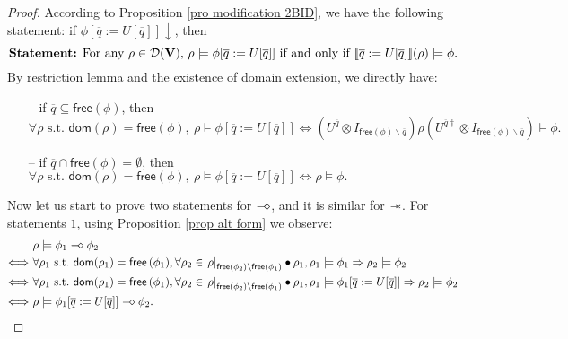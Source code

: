 \documentclass[conference,compsoc, 10pt]{IEEEtran}
\newcommand {\qbar} {{\overline{q}}}
\newcommand {\qU} {{\overline{q}:=U[\overline{q}]}}
\newcommand {\cD } {{\mathcal{D}}}
\newcommand {\id } {{I}}
\newcommand {\dom }[1] {{\mathsf{dom}\!\left(#1\right)}}
\newcommand {\free }[1] {{\mathsf{free}\left(#1\right)}}
\newcommand {\rt }[2] {{\left.{#1}\right|_{#2}}}
\newcommand {\vars } {\mathbf{V}}
\newcommand {\sepimp} {\mathrel{-\mkern-6mu*}}
\newcommand {\sem}[1] {\llbracket#1\rrbracket}
\newcommand {\sdimp} {\mathrel{-\mkern-2.5mu\diamond}}
\begin{document}
\begin{appendices}
		\vspace{0.2cm}
		
		\begin{proof}
			According to Proposition \ref{pro modification 2BID}, we have the following statement: if $\phi[\qU]\downarrow$, then 
			$$\text{{\bf Statement:} For any $\rho\in\cD(\vars)$, $\rho\models\phi[\qU]$ if and only if $\sem{\qU}(\rho)\models\phi$.} $$
			By restriction lemma and the existence of domain extension, we directly have: 
			\begin{itemize}
				\item[--] if $\qbar\subseteq\free{\phi}$, then $\forall\rho\text{\ s.t.\ }\dom{\rho} = \free{\phi},\ \rho\models\phi[\qU]\Leftrightarrow (U^{\qbar}\otimes\id_{\free{\phi}\backslash\qbar})\rho(U^{\qbar\dag}\otimes\id_{\free{\phi}\backslash\qbar})\models\phi.$
				\item[--] if $\qbar\cap\free{\phi}=\emptyset$, then $\forall\rho\text{\ s.t.\ }\dom{\rho} = \free{\phi},\ \rho\models\phi[\qU]\Leftrightarrow \rho\models\phi.$
			\end{itemize}
			
			Now let us start to prove two statements for $\sdimp$, and it is similar for $\sepimp$. For statements $\mathit 1$, using Proposition \ref{prop alt form} we observe:
			\begin{align*}
			&\rho\models\phi_1\sdimp\phi_2 \\
			\Longleftrightarrow\ &\forall\rho_1\text{\ s.t.\ }\dom{\rho_1}=\free{\phi_1}, \forall\rho_2\in\rt{\rho}{\free{\phi_2}\backslash\free{\phi_1}}\bullet\rho_1, \rho_1\models\phi_1\Rightarrow\rho_2\models\phi_2 \\
			\Longleftrightarrow\ &\forall\rho_1\text{\ s.t.\ }\dom{\rho_1}=\free{\phi_1}, \forall\rho_2\in\rt{\rho}{\free{\phi_2}\backslash\free{\phi_1}}\bullet\rho_1, \rho_1\models\phi_1[\qU]\Rightarrow\rho_2\models\phi_2 \\
			\Longleftrightarrow\ &\rho\models\phi_1[\qU]\sdimp\phi_2. 
			\end{align*}
			

\end{proof}
\end{appendices}
\end{document}
